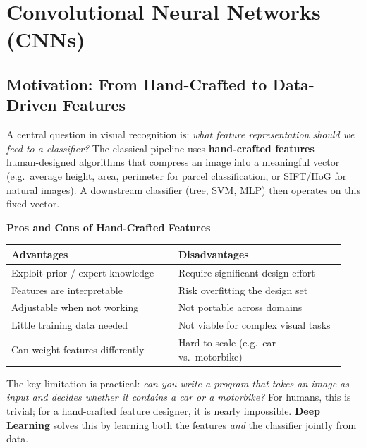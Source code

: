 \documentclass[11pt,a4paper]{article}
\newcommand{\term}[1]{\textcolor{DefGreen}{\textbf{#1}}}
\begin{document}
\section{Convolutional Neural Networks (CNNs)}
\label{sec:cnns}

\subsection{Motivation: From Hand-Crafted to Data-Driven Features}

A central question in visual recognition is: \emph{what feature representation should we feed to a classifier?} The classical pipeline uses \term{hand-crafted features} — human-designed algorithms that compress an image into a meaningful vector (e.g.\ average height, area, perimeter for parcel classification, or SIFT/HoG for natural images). A downstream classifier (tree, SVM, MLP) then operates on this fixed vector.

\begin{tcolorbox}[colback=LightBlue,colframe=AccentBlue,boxrule=0.8pt,arc=3pt]
\textbf{Pros and Cons of Hand-Crafted Features}\\[4pt]
\begin{tabular}{@{}p{0.47\linewidth}p{0.47\linewidth}@{}}
\toprule
\textbf{Advantages} & \textbf{Disadvantages} \\
\midrule
Exploit prior / expert knowledge & Require significant design effort \\
Features are interpretable & Risk overfitting the design set \\
Adjustable when not working & Not portable across domains \\
Little training data needed & Not viable for complex visual tasks \\
Can weight features differently & Hard to scale (e.g.\ car vs.\ motorbike) \\
\bottomrule
\end{tabular}
\end{tcolorbox}

The key limitation is practical: \emph{can you write a program that takes an image as input and decides whether it contains a car or a motorbike?} For humans, this is trivial; for a hand-crafted feature designer, it is nearly impossible. \term{Deep Learning} solves this by learning both the features \emph{and} the classifier jointly from data.
\end{document}
